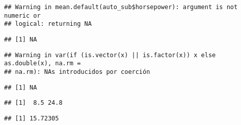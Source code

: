 \documentclass[
]{article}
\newenvironment{Shaded}{\begin{snugshade}}{\end{snugshade}}
\newcommand{\FunctionTok}[1]{\textcolor[rgb]{0.13,0.29,0.53}{\textbf{#1}}}
\newcommand{\NormalTok}[1]{#1}
\newcommand{\SpecialCharTok}[1]{\textcolor[rgb]{0.81,0.36,0.00}{\textbf{#1}}}
\begin{document}
\begin{verbatim}
## Warning in mean.default(auto_sub$horsepower): argument is not numeric or
## logical: returning NA
\end{verbatim}

\begin{verbatim}
## [1] NA
\end{verbatim}

\begin{Shaded}
\end{Shaded}

\begin{verbatim}
## Warning in var(if (is.vector(x) || is.factor(x)) x else as.double(x), na.rm =
## na.rm): NAs introducidos por coerción
\end{verbatim}

\begin{verbatim}
## [1] NA
\end{verbatim}

\begin{Shaded}
\end{Shaded}

\begin{verbatim}
## [1]  8.5 24.8
\end{verbatim}

\begin{Shaded}
\end{Shaded}

\begin{verbatim}
## [1] 15.72305
\end{verbatim}

\begin{Shaded}
\end{Shaded}
\end{document}
